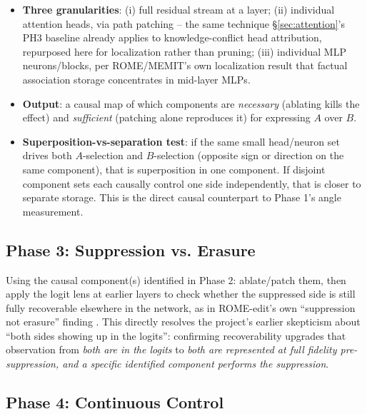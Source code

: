 \documentclass[11pt]{article}
\begin{document}
\begin{itemize}
  \item \textbf{Three granularities}: (i) full residual stream at a layer;
    (ii) individual attention heads, via path patching -- the same technique
    \S\ref{sec:attention}'s PH3 baseline \citep{jin2024cutting} already
    applies to knowledge-conflict head attribution, repurposed here for
    localization rather than pruning; (iii) individual MLP
    neurons/blocks, per ROME/MEMIT's own localization result that factual
    association storage concentrates in mid-layer MLPs.
  \item \textbf{Output}: a causal map of which components are
    \emph{necessary} (ablating kills the effect) and \emph{sufficient}
    (patching alone reproduces it) for expressing $A$ over $B$.
  \item \textbf{Superposition-vs-separation test}: if the same small
    head/neuron set drives both $A$-selection and $B$-selection (opposite
    sign or direction on the same component), that is superposition in one
    component. If disjoint component sets each causally control one side
    independently, that is closer to separate storage. This is the direct
    causal counterpart to Phase 1's angle measurement.
\end{itemize}

\subsection{Phase 3: Suppression vs. Erasure}
\label{sec:mechinterp-suppression}

Using the causal component(s) identified in Phase 2: ablate/patch them, then
apply the logit lens \citep{nostalgebraist2020logitlens} at earlier layers to
check whether the suppressed side is still fully recoverable elsewhere in the
network, as in ROME-edit's own ``suppression not erasure'' finding
\citep{meng2022rome}. This directly resolves the project's earlier
skepticism about ``both sides showing up in the logits'': confirming
recoverability upgrades that observation from \emph{both are in the logits}
to \emph{both are represented at full fidelity pre-suppression, and a
specific identified component performs the suppression}.

\subsection{Phase 4: Continuous Control}
\label{sec:mechinterp-dial}
\end{document}
